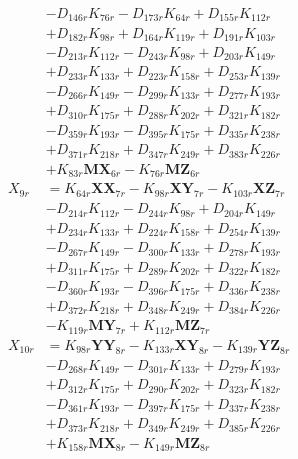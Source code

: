 \begin{multicols}{2}
\begin{align}
&- D_{146r}K_{76r} - D_{173r}K_{64r} + D_{155r}K_{112r}  \nonumber \\
&+ D_{182r}K_{98r} + D_{164r}K_{119r} + D_{191r}K_{103r}  \nonumber \\
&- D_{213r}K_{112r} - D_{243r}K_{98r} + D_{203r}K_{149r}  \nonumber \\
&+ D_{233r}K_{133r} + D_{223r}K_{158r} + D_{253r}K_{139r}  \nonumber \\
&- D_{266r}K_{149r} - D_{299r}K_{133r} + D_{277r}K_{193r}  \nonumber \\
&+ D_{310r}K_{175r} + D_{288r}K_{202r} + D_{321r}K_{182r}  \nonumber \\
&- D_{359r}K_{193r} - D_{395r}K_{175r} + D_{335r}K_{238r}  \nonumber \\
&+ D_{371r}K_{218r} + D_{347r}K_{249r} + D_{383r}K_{226r}  \nonumber \\
&+ K_{83r}\mathbf{MX}_{6r} - K_{76r}\mathbf{MZ}_{6r} \nonumber \\
X_{9r} &= K_{64r}\mathbf{XX}_{7r} - K_{98r}\mathbf{XY}_{7r} - K_{103r}\mathbf{XZ}_{7r}  \nonumber \\
&- D_{214r}K_{112r} - D_{244r}K_{98r} + D_{204r}K_{149r}  \nonumber \\
&+ D_{234r}K_{133r} + D_{224r}K_{158r} + D_{254r}K_{139r}  \nonumber \\
&- D_{267r}K_{149r} - D_{300r}K_{133r} + D_{278r}K_{193r}  \nonumber \\
&+ D_{311r}K_{175r} + D_{289r}K_{202r} + D_{322r}K_{182r}  \nonumber \\
&- D_{360r}K_{193r} - D_{396r}K_{175r} + D_{336r}K_{238r}  \nonumber \\
&+ D_{372r}K_{218r} + D_{348r}K_{249r} + D_{384r}K_{226r}  \nonumber \\
&- K_{119r}\mathbf{MY}_{7r} + K_{112r}\mathbf{MZ}_{7r} \nonumber \\
X_{10r} &= K_{98r}\mathbf{YY}_{8r} - K_{133r}\mathbf{XY}_{8r} - K_{139r}\mathbf{YZ}_{8r}  \nonumber \\
&- D_{268r}K_{149r} - D_{301r}K_{133r} + D_{279r}K_{193r}  \nonumber \\
&+ D_{312r}K_{175r} + D_{290r}K_{202r} + D_{323r}K_{182r}  \nonumber \\
&- D_{361r}K_{193r} - D_{397r}K_{175r} + D_{337r}K_{238r}  \nonumber \\
&+ D_{373r}K_{218r} + D_{349r}K_{249r} + D_{385r}K_{226r}  \nonumber \\
&+ K_{158r}\mathbf{MX}_{8r} - K_{149r}\mathbf{MZ}_{8r} \nonumber \\

\end{align}
\end{multicols}
